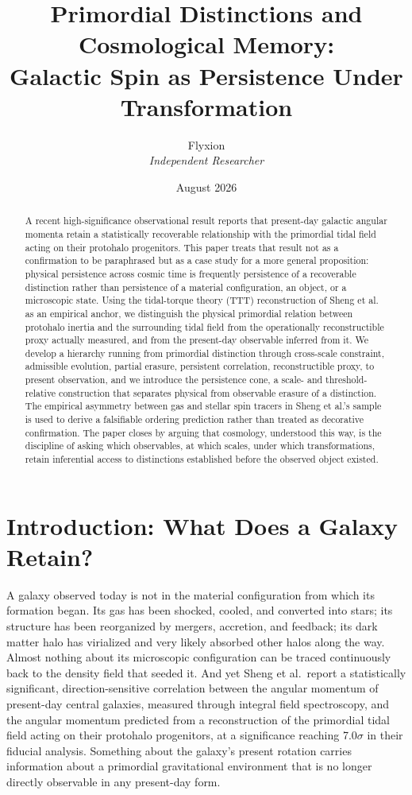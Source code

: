\documentclass[11pt]{article}
\title{Primordial Distinctions and Cosmological Memory:\\
Galactic Spin as Persistence Under Transformation}
\author{Flyxion\\ \textit{Independent Researcher}}
\date{August 2026}
\begin{document}
\maketitle

\begin{abstract}
\noindent A recent high-significance observational result reports that present-day galactic angular momenta retain a statistically recoverable relationship with the primordial tidal field acting on their protohalo progenitors. This paper treats that result not as a confirmation to be paraphrased but as a case study for a more general proposition: physical persistence across cosmic time is frequently persistence of a recoverable distinction rather than persistence of a material configuration, an object, or a microscopic state. Using the tidal-torque theory (TTT) reconstruction of Sheng et al. as an empirical anchor, we distinguish the physical primordial relation between protohalo inertia and the surrounding tidal field from the operationally reconstructible proxy actually measured, and from the present-day observable inferred from it. We develop a hierarchy running from primordial distinction through cross-scale constraint, admissible evolution, partial erasure, persistent correlation, reconstructible proxy, to present observation, and we introduce the persistence cone, a scale- and threshold-relative construction that separates physical from observable erasure of a distinction. The empirical asymmetry between gas and stellar spin tracers in Sheng et al.'s sample is used to derive a falsifiable ordering prediction rather than treated as decorative confirmation. The paper closes by arguing that cosmology, understood this way, is the discipline of asking which observables, at which scales, under which transformations, retain inferential access to distinctions established before the observed object existed.
\end{abstract}

\section{Introduction: What Does a Galaxy Retain?}

A galaxy observed today is not in the material configuration from which its formation began. Its gas has been shocked, cooled, and converted into stars; its structure has been reorganized by mergers, accretion, and feedback; its dark matter halo has virialized and very likely absorbed other halos along the way. Almost nothing about its microscopic configuration can be traced continuously back to the density field that seeded it. And yet Sheng et al.\ report a statistically significant, direction-sensitive correlation between the angular momentum of present-day central galaxies, measured through integral field spectroscopy, and the angular momentum predicted from a reconstruction of the primordial tidal field acting on their protohalo progenitors, at a significance reaching 7.0$\sigma$ in their fiducial analysis. Something about the galaxy's present rotation carries information about a primordial gravitational environment that is no longer directly observable in any present-day form.
\end{document}
